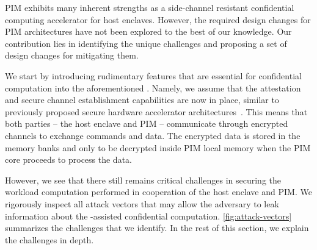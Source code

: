 
PIM exhibits many inherent strengths as a side-channel resistant confidential computing accelerator for host enclaves. However, the required design changes for PIM architectures have not been explored to the best of our knowledge. Our contribution lies in identifying the unique challenges and proposing a set of design changes for mitigating them.

We start by introducing rudimentary features that are essential for confidential computation into the aforementioned \baseline. Namely, we assume that the attestation and secure channel establishment capabilities are now in place, similar to previously proposed secure hardware accelerator architectures~\cite{graviton,trustore,invisimem}. This means that both parties -- the host enclave and PIM -- communicate through encrypted channels to exchange commands and data. The encrypted data is stored in the memory banks and only to be decrypted inside PIM local memory when the PIM core proceeds to process the data.

However, we see that there still remains critical challenges in securing the workload computation performed in cooperation of the host enclave and PIM. We rigorously inspect all attack vectors that may allow the adversary to leak information about the \thename-assisted confidential computation. \autoref{fig:attack-vectors} summarizes the challenges that we identify. In the rest of this section, we explain the challenges in depth.





